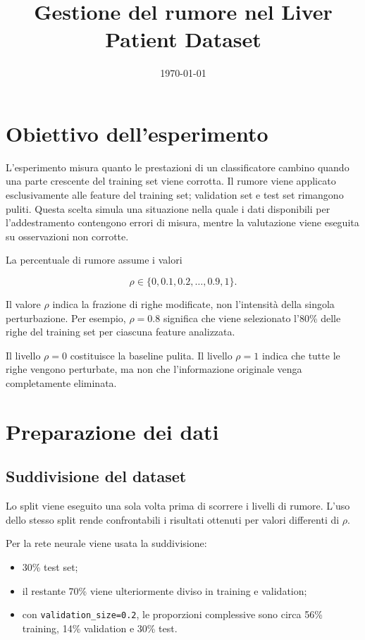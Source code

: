 \documentclass[11pt,a4paper]{article}
\title{Gestione del rumore nel Liver Patient Dataset}
\author{}
\date{\today}
\begin{document}
\maketitle
\tableofcontents
\newpage

\section{Obiettivo dell'esperimento}

L'esperimento misura quanto le prestazioni di un classificatore cambino quando una parte crescente del training set viene corrotta. Il rumore viene applicato esclusivamente alle feature del training set; validation set e test set rimangono puliti. Questa scelta simula una situazione nella quale i dati disponibili per l'addestramento contengono errori di misura, mentre la valutazione viene eseguita su osservazioni non corrotte.

La percentuale di rumore assume i valori

\[
\rho \in \{0,0.1,0.2,\ldots,0.9,1\}.
\]

Il valore $\rho$ indica la frazione di righe modificate, non l'intensità della singola perturbazione. Per esempio, $\rho=0.8$ significa che viene selezionato l'80\% delle righe del training set per ciascuna feature analizzata.

Il livello $\rho=0$ costituisce la baseline pulita. Il livello $\rho=1$ indica che tutte le righe vengono perturbate, ma non che l'informazione originale venga completamente eliminata.

\section{Preparazione dei dati}

\subsection{Suddivisione del dataset}

Lo split viene eseguito una sola volta prima di scorrere i livelli di rumore. L'uso dello stesso split rende confrontabili i risultati ottenuti per valori differenti di $\rho$.

Per la rete neurale viene usata la suddivisione:

\begin{itemize}[noitemsep]
    \item 30\% test set;
    \item il restante 70\% viene ulteriormente diviso in training e validation;
    \item con \texttt{validation\_size=0.2}, le proporzioni complessive sono circa 56\% training, 14\% validation e 30\% test.
\end{itemize}
\end{document}
